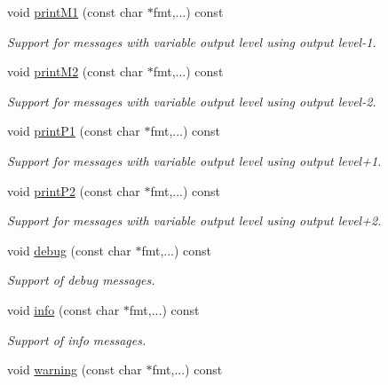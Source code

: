 \begin{DoxyCompactItemize}
void \hyperlink{class_d_d4hep_1_1_simulation_1_1_geant4_action_ada091d86e8b88d764d13b4cd79f8543d}{print\+M1} (const char $\ast$fmt,...) const
\begin{DoxyCompactList}\small\item\em Support for messages with variable output level using output level-\/1. \end{DoxyCompactList}\item 
void \hyperlink{class_d_d4hep_1_1_simulation_1_1_geant4_action_a973b20385610fd757154eff3635c55a1}{print\+M2} (const char $\ast$fmt,...) const
\begin{DoxyCompactList}\small\item\em Support for messages with variable output level using output level-\/2. \end{DoxyCompactList}\item 
void \hyperlink{class_d_d4hep_1_1_simulation_1_1_geant4_action_ae90c8c67240ca2a418d38a1c8a924077}{print\+P1} (const char $\ast$fmt,...) const
\begin{DoxyCompactList}\small\item\em Support for messages with variable output level using output level+1. \end{DoxyCompactList}\item 
void \hyperlink{class_d_d4hep_1_1_simulation_1_1_geant4_action_ae56185e13ffe3255d349b848c2157699}{print\+P2} (const char $\ast$fmt,...) const
\begin{DoxyCompactList}\small\item\em Support for messages with variable output level using output level+2. \end{DoxyCompactList}\item 
void \hyperlink{class_d_d4hep_1_1_simulation_1_1_geant4_action_a22a58ac372d240b1a7d0f34f1fc1a67b}{debug} (const char $\ast$fmt,...) const
\begin{DoxyCompactList}\small\item\em Support of debug messages. \end{DoxyCompactList}\item 
void \hyperlink{class_d_d4hep_1_1_simulation_1_1_geant4_action_ad458cc4957a876c0cbbc9ad6354fc187}{info} (const char $\ast$fmt,...) const
\begin{DoxyCompactList}\small\item\em Support of info messages. \end{DoxyCompactList}\item 
void \hyperlink{class_d_d4hep_1_1_simulation_1_1_geant4_action_ae62935fef8595dbc8c1d7f9c278523e4}{warning} (const char $\ast$fmt,...) const

\end{DoxyCompactItemize}
